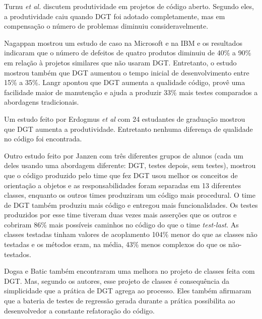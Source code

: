 Turnu \textit{et al.} \cite{turnu-tdd-opensouce} discutem produtividade em
projetos de código aberto. Segundo eles, a produtividade caiu quando DGT foi
adotado completamente, mas em compensação o número de problemas diminuiu 
consideravelmente.

Nagappan \cite{nagappan-ms} mostrou um estudo de caso na Microsoft e na IBM e os
resultados indicaram que o número de defeitos de quatro produtos diminuiu de 
40\% a 90\% em relação à projetos similares que não usaram DGT. Entretanto, o 
estudo mostrou também que DGT aumentou o tempo inicial de desenvolvimento entre 15\%
a 35\%. Langr \cite{langr} apontou que DGT aumenta a qualidade código, provê uma 
facilidade maior de manutenção e ajuda a produzir 33\% mais testes comparados  a
abordagens tradicionais.

Um estudo feito por Erdogmus \textit{et al} \cite{erdogmus-morisio} com 24 estudantes de
graduação mostrou que DGT aumenta a produtividade. Entretanto nenhuma diferença 
de qualidade no código foi encontrada.

Outro estudo feito por Janzen \cite{janzen-saiedian} com três diferentes grupos
de alunos (cada um deles usando uma abordagem diferente: DGT, testes depois, sem
testes), mostrou que o código produzido pelo time que fez DGT usou melhor os
conceitos de orientação a objetos e as responsabilidades foram separadas em 13 
diferentes classes, enquanto os outros times produziram um código mais
procedural. O time de DGT também produziu mais código e entregou mais
funcionalidades. Os testes produzidos por esse time tiveram duas vezes mais
asserções que os outros e cobriram 86\% mais possíveis caminhos no código 
do que o time \textit{test-last}. 
As classes testadas tinham valores de acoplamento 104\% menor do 
que as classes não testadas e os métodos eram, na média, 43\% menos complexos 
do que os não-testados.

Dogsa e Batic \cite{dogsa-batic} também encontraram uma melhora no
projeto de classes feita com DGT. Mas, segundo os autores, esse projeto de classes é 
consequência da simplicidade que a prática de DGT agrega ao processo. Eles
também  afirmaram que a bateria de testes de regressão gerada durante a prática 
possibilita ao desenvolvedor a constante refatoração do código.

